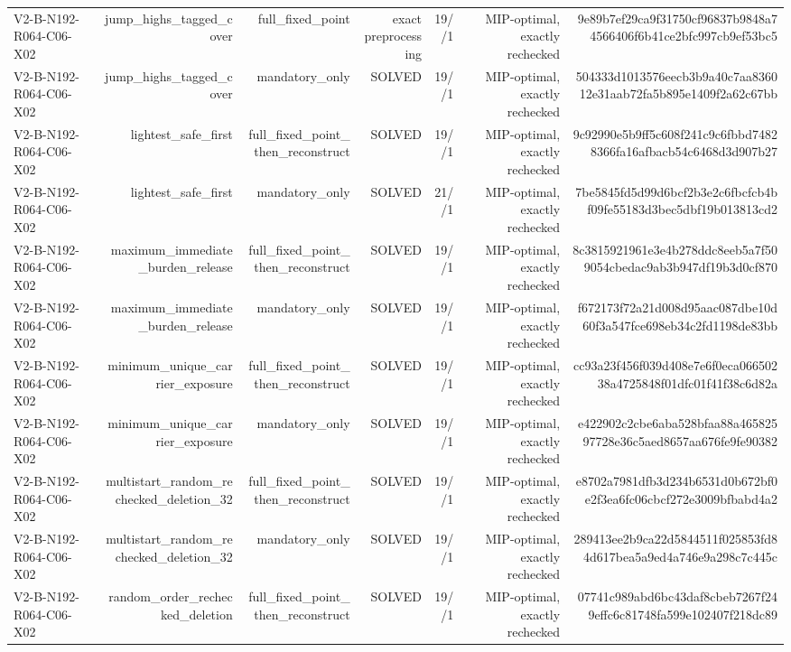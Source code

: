 {\begin{longtable}{lrrrrrr}
V2-B-N192-R064-C06-X02 & jump\_highs\_tagged\_cover & full\_fixed\_point & exact preprocessing & 19//1 & MIP-optimal, exactly rechecked & 9e89b7ef29ca9f31750cf96837b9848a74566406f6b41ce2bfc997cb9ef53bc5 \\
V2-B-N192-R064-C06-X02 & jump\_highs\_tagged\_cover & mandatory\_only & SOLVED & 19//1 & MIP-optimal, exactly rechecked & 504333d1013576eecb3b9a40c7aa836012e31aab72fa5b895e1409f2a62c67bb \\
V2-B-N192-R064-C06-X02 & lightest\_safe\_first & full\_fixed\_point\_then\_reconstruct & SOLVED & 19//1 & MIP-optimal, exactly rechecked & 9c92990e5b9ff5c608f241c9c6fbbd74828366fa16afbacb54c6468d3d907b27 \\
V2-B-N192-R064-C06-X02 & lightest\_safe\_first & mandatory\_only & SOLVED & 21//1 & MIP-optimal, exactly rechecked & 7be5845fd5d99d6bcf2b3e2c6fbcfcb4bf09fe55183d3bec5dbf19b013813cd2 \\
V2-B-N192-R064-C06-X02 & maximum\_immediate\_burden\_release & full\_fixed\_point\_then\_reconstruct & SOLVED & 19//1 & MIP-optimal, exactly rechecked & 8c3815921961e3e4b278ddc8eeb5a7f509054cbedac9ab3b947df19b3d0cf870 \\
V2-B-N192-R064-C06-X02 & maximum\_immediate\_burden\_release & mandatory\_only & SOLVED & 19//1 & MIP-optimal, exactly rechecked & f672173f72a21d008d95aac087dbe10d60f3a547fce698eb34c2fd1198de83bb \\
V2-B-N192-R064-C06-X02 & minimum\_unique\_carrier\_exposure & full\_fixed\_point\_then\_reconstruct & SOLVED & 19//1 & MIP-optimal, exactly rechecked & cc93a23f456f039d408e7e6f0eca06650238a4725848f01dfc01f41f38c6d82a \\
V2-B-N192-R064-C06-X02 & minimum\_unique\_carrier\_exposure & mandatory\_only & SOLVED & 19//1 & MIP-optimal, exactly rechecked & e422902c2cbe6aba528bfaa88a46582597728e36c5aed8657aa676fe9fe90382 \\
V2-B-N192-R064-C06-X02 & multistart\_random\_rechecked\_deletion\_32 & full\_fixed\_point\_then\_reconstruct & SOLVED & 19//1 & MIP-optimal, exactly rechecked & e8702a7981dfb3d234b6531d0b672bf0e2f3ea6fc06cbcf272e3009bfbabd4a2 \\
V2-B-N192-R064-C06-X02 & multistart\_random\_rechecked\_deletion\_32 & mandatory\_only & SOLVED & 19//1 & MIP-optimal, exactly rechecked & 289413ee2b9ca22d5844511f025853fd84d617bea5a9ed4a746e9a298c7c445c \\
V2-B-N192-R064-C06-X02 & random\_order\_rechecked\_deletion & full\_fixed\_point\_then\_reconstruct & SOLVED & 19//1 & MIP-optimal, exactly rechecked & 07741c989abd6bc43daf8cbeb7267f249effc6c81748fa599e102407f218dc89 \\

\end{longtable}}
